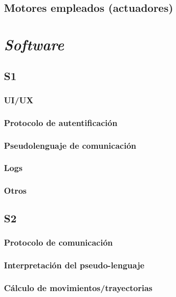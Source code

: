 \section{Motores empleados (actuadores)}


\chapter{\textit{Software}}
\label{chap:software}

\section{S1}

\subsection{UI/UX}

\subsection{Protocolo de autentificación}

\subsection{Pseudolenguaje de comunicación}

\subsection{Logs}

\subsection{Otros}

\section{S2}

\subsection{Protocolo de comunicación}

\subsection{Interpretación del pseudo-lenguaje}

\subsection{Cálculo de movimientos/trayectorias}

